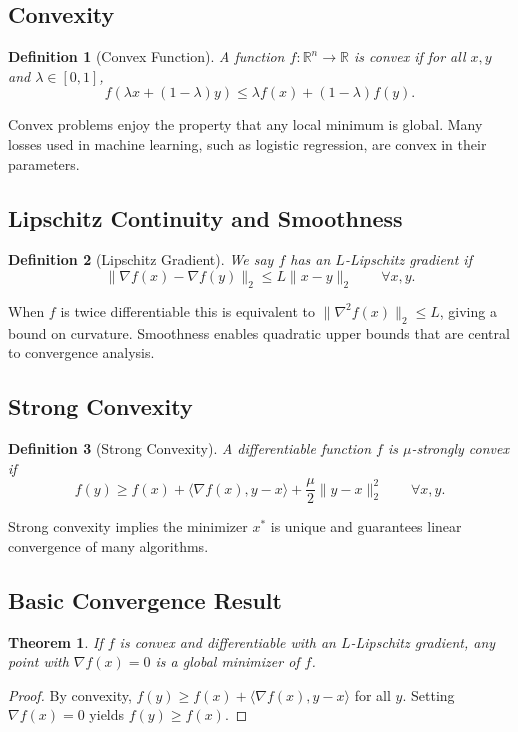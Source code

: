 \documentclass[11pt]{book}
\newtheorem{theorem}{Theorem}[chapter]
\newtheorem{definition}{Definition}[chapter]
\begin{document}
\subsection{Convexity}
\begin{definition}[Convex Function]
A function $f: \mathbb{R}^n\to\mathbb{R}$ is \emph{convex} if for all $x,y$ and $\lambda\in[0,1]$,
\begin{equation}
f(\lambda x+(1-\lambda)y)\le \lambda f(x)+(1-\lambda)f(y).
\end{equation}
\end{definition}
Convex problems enjoy the property that any local minimum is global. Many losses used in machine learning, such as logistic regression, are convex in their parameters.

\subsection{Lipschitz Continuity and Smoothness}
\begin{definition}[Lipschitz Gradient]
We say $f$ has an $L$-Lipschitz gradient if
\begin{equation}
\|\nabla f(x)-\nabla f(y)\|_2\le L\|x-y\|_2 \qquad \forall x,y.
\end{equation}
\end{definition}
When $f$ is twice differentiable this is equivalent to $\|\nabla^2 f(x)\|_2\le L$, giving a bound on curvature. Smoothness enables quadratic upper bounds that are central to convergence analysis.

\subsection{Strong Convexity}
\begin{definition}[Strong Convexity]
A differentiable function $f$ is \emph{$\mu$-strongly convex} if
\begin{equation}
f(y)\ge f(x)+\langle\nabla f(x),y-x\rangle+\frac{\mu}{2}\|y-x\|_2^2 \qquad \forall x,y.
\end{equation}
\end{definition}
Strong convexity implies the minimizer $x^*$ is unique and guarantees linear convergence of many algorithms.

\subsection{Basic Convergence Result}
\begin{theorem}
If $f$ is convex and differentiable with an $L$-Lipschitz gradient, any point with $\nabla f(x)=0$ is a global minimizer of $f$.
\end{theorem}
\begin{proof}
By convexity, $f(y)\ge f(x)+\langle\nabla f(x),y-x\rangle$ for all $y$. Setting $\nabla f(x)=0$ yields $f(y)\ge f(x)$.
\end{proof}
\end{document}
